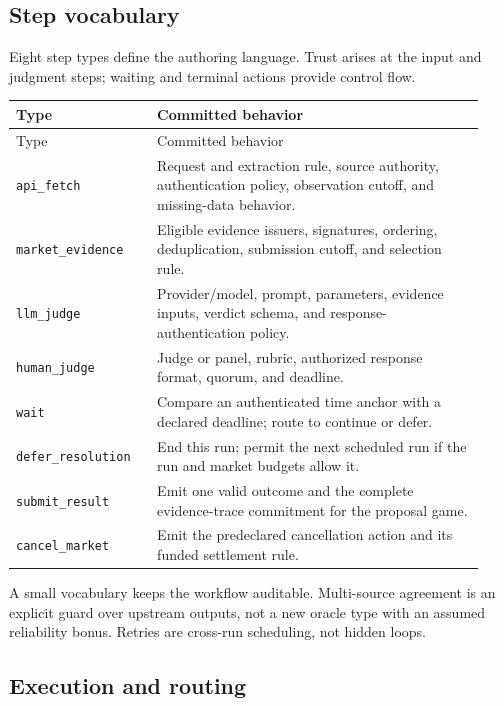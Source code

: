 \documentclass[10pt]{article}
\begin{document}
\subsection{Step vocabulary}

Eight step types define the authoring language. Trust arises at the input and judgment steps; waiting and terminal actions provide control flow.

\begin{center}
\small
\begin{longtable}{@{}p{0.28\linewidth}p{0.65\linewidth}@{}}
\toprule
Type & Committed behavior \\
\midrule
\endfirsthead
\toprule Type & Committed behavior \\
\midrule
\endhead
\texttt{api\_fetch} & Request and extraction rule, source authority, authentication policy, observation cutoff, and missing-data behavior. \\
\texttt{market\_evidence} & Eligible evidence issuers, signatures, ordering, deduplication, submission cutoff, and selection rule. \\
\texttt{llm\_judge} & Provider/model, prompt, parameters, evidence inputs, verdict schema, and response-authentication policy. \\
\texttt{human\_judge} & Judge or panel, rubric, authorized response format, quorum, and deadline. \\
\texttt{wait} & Compare an authenticated time anchor with a declared deadline; route to continue or defer. \\
\texttt{defer\_resolution} & End this run; permit the next scheduled run if the run and market budgets allow it. \\
\texttt{submit\_result} & Emit one valid outcome and the complete evidence-trace commitment for the proposal game. \\
\texttt{cancel\_market} & Emit the predeclared cancellation action and its funded settlement rule. \\
\bottomrule
\end{longtable}
\end{center}

A small vocabulary keeps the workflow auditable. Multi-source agreement is an explicit guard over upstream outputs, not a new oracle type with an assumed reliability bonus. Retries are cross-run scheduling, not hidden loops.

\subsection{Execution and routing}
\end{document}
